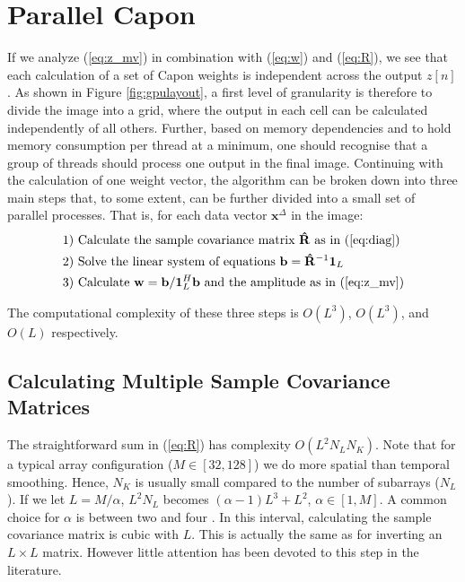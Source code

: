 \documentclass[conference]{IEEEtran}
\newcommand{\mat}[1]{\mathbf{#1}}
\renewcommand{\vec}[1]{\mathbf{#1}}
\begin{document}
\section{Parallel Capon}\label{sec:meth}
If we analyze (\ref{eq:z_mv}) in combination with (\ref{eq:w}) and (\ref{eq:R}), we see that each calculation of a set of Capon weights is independent across the output $z[n]$. As shown in Figure \ref{fig:gpulayout}, a first level of granularity is therefore to divide the image into a grid, where the output in each cell can be calculated independently of all others. Further, based on memory dependencies and to hold memory consumption per thread at a minimum, one should recognise that a group of threads should process one output in the final image. Continuing with the calculation of one weight vector, the algorithm can be broken down into three main steps that, to some extent, can be further divided into a small set of parallel processes. That is, for each data vector $\vec{x}^\Delta$ in the image:
\begin{align*}
\text{1) } &\text{Calculate the sample covariance matrix } \mat{\hat{R}} \text{ as in } \text{(\ref{eq:diag})}\\
\text{2) } &\text{Solve the linear system of equations } \vec{b} =\mat{\hat{R}}^{-1}\vec{1}_L\\
\text{3) } &\text{Calculate } \vec{w} = \vec{b}/\vec{1}_{L}^H\vec{b} \text{ and the amplitude as in (\ref{eq:z_mv})}
\end{align*}

The computational complexity of these three steps is $O(L^3)$, $O(L^3)$, and $O(L)$ respectively.

\subsection{Calculating Multiple Sample Covariance Matrices}
The straightforward sum in (\ref{eq:R}) has complexity $O(L^2N_LN_K)$. Note that for a typical array configuration ($M \in [32, 128]$) we do more spatial than temporal smoothing. Hence, $N_K$ is usually small compared to the number of subarrays ($N_L$). If we let $L = M/\alpha$, $L^2N_L$ becomes $(\alpha - 1)L^3 + L^2$, $\alpha \in [1, M]$. A common choice for $\alpha$ is between two and four \cite{Synnevag2007, Mehdizadeh2012, Synnevag2007a, Austeng2008}. In this interval, calculating the sample covariance matrix is cubic with $L$. This is actually the same as for inverting an $L \times L$ matrix. However little attention has been devoted to this step in the literature.
\end{document}
